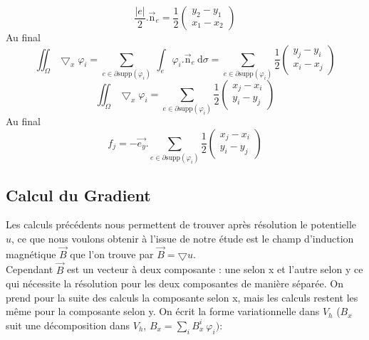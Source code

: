 \documentclass[a4paper,12pt,titlepage]{report}
\begin{document}
\begin{onehalfspace}
\[	\frac{|e|}{2}.\vec{\text{n}}_{e} = 
	\frac{1}{2}
	\begin{pmatrix}
		y_{2}-y_{1} \\
		x_{1}-x_{2}
	\end{pmatrix}	
\] 
Au final
\[
	\iint_{\Omega}\bigtriangledown_{x}{\varphi_{i}} =
	\sum_{e \in \partial \text{supp}(\varphi_{i})}\ \int_{e}\varphi_{i}.\vec{\text{n}}_{e}\ \text{d} \sigma =
	\sum_{e \in \partial\text{supp}(\varphi_{i})}
	\frac{1}{2}
	\begin{pmatrix}
		y_{j}-y_{i} \\
		x_{i}-x_{j}
	\end{pmatrix}
\]
\[
	\iint_{\Omega}\bigtriangledown_{x}{\varphi_{i}} =
	\sum_{e \in \partial \text{supp}(\varphi_{i})}
	\frac{1}{2}
	\begin{pmatrix}
		x_{j}-x_{i} \\
		y_{i}-y_{j}
	\end{pmatrix}
\]
Au final 
\[\boxed{f_{j} =  -\vec{e_{y}}.\sum_{e \in \partial \text{supp}(\varphi_{i})}
	\frac{1}{2}
	\begin{pmatrix}
		x_{j}-x_{i} \\
		y_{i}-y_{j}
	\end{pmatrix}}
\]

				

\subsection{Calcul du Gradient}

Les calculs précédents nous permettent de trouver après résolution le potentielle $u$, ce que nous voulons obtenir à l'issue de notre étude est le champ d'induction magnétique $\vec{B}$ que l'on trouve par $\vec{B}= \bigtriangledown u$.
\\
Cependant $\vec{B}$ est un vecteur à deux composante : une selon x et l'autre selon y ce qui nécessite la résolution pour les deux composantes de manière séparée.
On prend pour la suite des calculs la composante selon x, mais les calculs restent les même pour la composante selon y.
\newline  On écrit la forme variationnelle dans $V_{h}$ ($B_x$ suit une décomposition dans $V_h$, $B_x=\sum_{i} B_{x}^{i}\ \varphi_i)$:


\end{onehalfspace}
\end{document}
